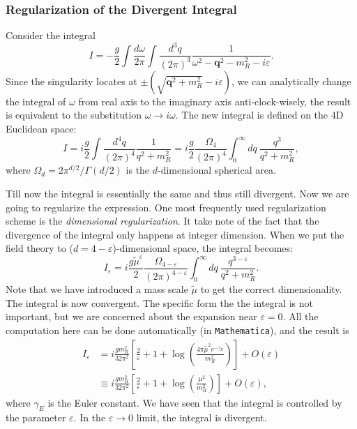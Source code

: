 \documentclass[aps,prb,superscriptaddress,nofootinbib]{revtex4}
\begin{document}
\subsubsection{Regularization of the Divergent Integral}
Consider the integral
\begin{equation}
	I = -\frac{g}{2} \int\frac{d \omega}{2\pi} \int\frac{d^3 q}{(2\pi)^3} \frac{1}{\omega^2 - \bm q^2-m_R^2 -i\varepsilon}.
\end{equation}
Since the singularity locates at $\pm(\sqrt{\bm q^2+m_R^2}-i\varepsilon)$, we can analytically change the integral of $\omega$ from real axis to the imaginary axis anti-clock-wisely, the result is equivalent to the substitution $\omega \rightarrow i\omega$.
The new integral is defined on the 4D Euclidean space:
\begin{equation}
	I = i \frac{g}{2} \int \frac{d^4 q}{(2\pi)^4} \frac{1}{q^2 + m_R^2}
	= i\frac{g}{2} \frac{\Omega_4}{(2\pi)^4} \int_0^\infty dq \ \frac{q^3}{q^2 + m^2_R},
\end{equation}
where $\Omega_d = 2 \pi^{d/2}/\Gamma\left(d/2\right)$ is the $d$-dimensional spherical area.

Till now the integral is essentially the same and thus still divergent.
Now we are going to regularize the expression.
One most frequently used regularization scheme is the \textit{dimensional regularization}.
It take note of the fact that the divergence of the integral only happens at integer dimension.
When we put the field theory to ($d=4-\varepsilon$)-dimensional space, the integral becomes:
\begin{equation}
	I_\varepsilon = i\frac{g\tilde{\mu}^\varepsilon}{2}\frac{\Omega_{4-\varepsilon}}{(2\pi)^{4-\varepsilon}} \int_0^\infty dq\ \frac{q^{3-\varepsilon}}{q^2+m_R^2}.
\end{equation}
Note that we have introduced a mass scale $\tilde\mu$ to get the correct dimensionality.
The integral is now convergent.
The specific form the the integral is not important, but we are concerned about the expansion near $\varepsilon = 0$. 
All the computation here can be done automatically (in \texttt{Mathematica}), and the result is
\begin{equation}
\begin{aligned}
	I_\varepsilon &= i\frac{g m_R^2}{32\pi^2} \left[\frac{2}{\varepsilon}+1+\log \left(\frac{4 \pi \tilde{\mu}^2 e^{-\gamma_E}}{m_R^2}\right)\right] + O(\varepsilon) \\
	&\equiv i\frac{g m_R^2}{32\pi^2} \left[\frac{2}{\varepsilon}+1+\log \left(\frac{\mu^2}{m_R^2}\right)\right] + O(\varepsilon),
\end{aligned}
\end{equation}
where $\gamma_E$ is the Euler constant. 
We have seen that the integral is controlled by the parameter $\varepsilon$.
In the $\varepsilon \rightarrow 0$ limit, the integral is divergent.
\end{document}

